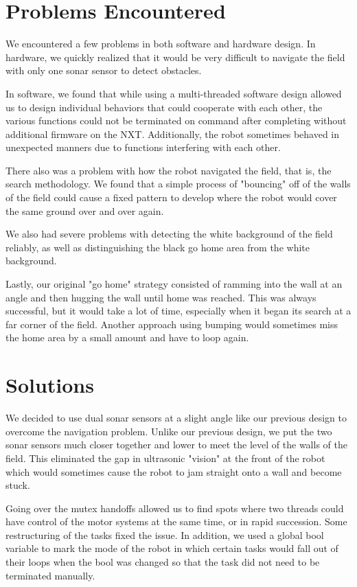 \documentclass[journal]{IEEEtran}
\begin{document}
\section{Problems Encountered}\label{S.problems}
We encountered a few problems in both software and hardware design. In hardware, we quickly realized that it would be very difficult to navigate the field with only one sonar sensor to detect obstacles.

In software, we found that while using a multi-threaded software design allowed us to design individual behaviors that could cooperate with each other, the various functions could not be terminated on command after completing without additional firmware on the NXT. Additionally, the robot sometimes behaved in unexpected manners due to functions interfering with each other.

There also was a problem with how the robot navigated the field, that is, the search methodology. We found that a simple process of "bouncing" off of the walls of the field could cause a fixed pattern to develop where the robot would cover the same ground over and over again.

We also had severe problems with detecting the white background of the field reliably, as well as distinguishing the black go home area from the white background.

Lastly, our original "go home" strategy consisted of ramming into the wall at an angle and then hugging the wall until home was reached. This was always successful, but it would take a lot of time, especially when it began its search at a far corner of the field. Another approach using bumping would sometimes miss the home area by a small amount and have to loop again.

\section{Solutions}\label{S.solutions}
We decided to use dual sonar sensors at a slight angle like our previous design to overcome the navigation problem. Unlike our previous design, we put the two sonar sensors much closer together and lower to meet the level of the walls of the field. This eliminated the gap in ultrasonic "vision" at the front of the robot which would sometimes cause the robot to jam straight onto a wall and become stuck.

Going over the mutex handoffs allowed us to find spots where two threads could have control of the motor systems at the same time, or in rapid succession. Some restructuring of the tasks fixed the issue. In addition, we used a global bool variable to mark the mode of the robot in which certain tasks would fall out of their loops when the bool was changed so that the task did not need to be terminated manually.
\end{document}
